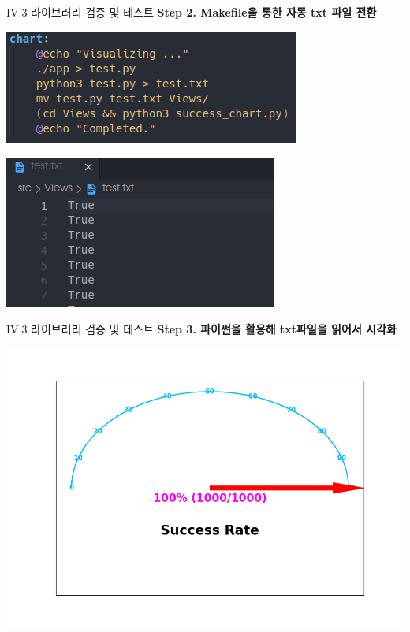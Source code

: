 \documentclass{beamer}
\begin{document}
\begin{frame}{IV.3 라이브러리 검증 및 테스트}
	\alert{\bf Step 2. Makefile을 통한 자동 txt 파일 전환}\\
	\begin{center}
		\begin{minipage}{.45\linewidth}
			\includegraphics[width=\linewidth]{lib4_2.png}
		\end{minipage}
	\begin{minipage}{.45\linewidth}
	\includegraphics[width=\linewidth]{lib4_3.png}
\end{minipage}
	\end{center}
\end{frame}
\begin{frame}{IV.3 라이브러리 검증 및 테스트}
	\alert{\bf Step 3. 파이썬을 활용해 txt파일을 읽어서 시각화}\\
	\begin{center}
		\includegraphics[width=\linewidth]{lib4_4.png}
	\end{center}
\end{frame}
\end{document}

